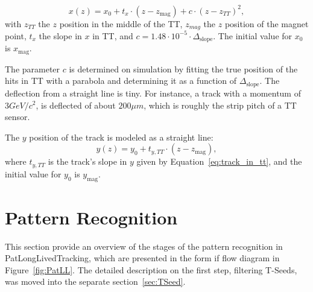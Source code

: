 \begin{equation}
\label{eq:track_in_tt}
x(z) = x_{0} + t_{x} \cdot (z - z_{\text{mag}}) +c \cdot (z - z_{TT})^{2},
\end{equation}
with $z_{TT}$ the $z$ position in the middle of the TT, $z_{mag}$ the $z$
position of the magnet point, $t_{x} $ the slope in $x$ in TT, and
$c= 1.48\cdot 10^{-5} \cdot \Delta_{\text{slope}}$. The initial value for $x_{0}$ is $x_{\text{mag}}$.
 
The parameter $c$ is determined on simulation by fitting the true position of the hits in TT with a parabola and determining it as a function of $\Delta_{\text{slope}}$. The deflection from a straight line is tiny. For instance, a track with a momentum of $3 GeV/c^{2}$, is deflected of about $200\mu m$, which is roughly the strip pitch of a TT sensor.

The $y$ position of the track is modeled as a straight line: 
\begin{equation}
y(z) = y_{0} + t_{y,TT} \cdot (z - z_{\text{mag}}),
\end{equation}
where $t_{y,TT} $ is the track's slope in $y$ given by Equation~\ref{eq:track_in_tt}, and  the initial value for $y_{0}$ is $y_{\text{mag}}$. 

\section{Pattern Recognition}

This section provide an overview of the stages of the pattern recognition in PatLongLivedTracking, which are presented in the form if flow diagram in Figure~\ref{fig:PatLL}. The detailed description on the first step, filtering T-Seeds, was moved into the separate section~\ref{sec:TSeed}. 

